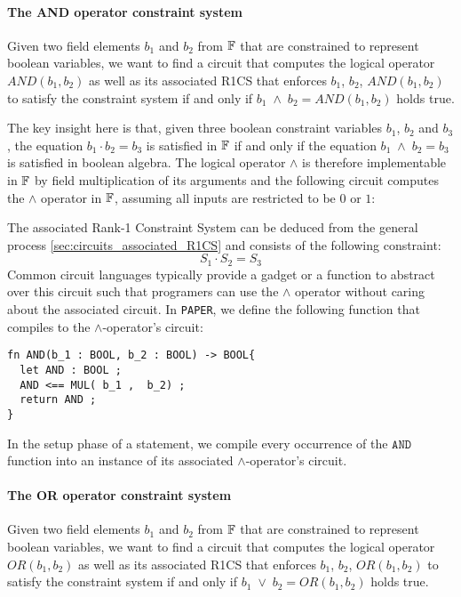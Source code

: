 \paragraph{The AND operator constraint system} Given two field elements $b_1$ and $b_2$ from $\mathbb{F}$ that are constrained to represent boolean variables, we want to find a circuit that computes the logical  operator $AND(b_1,b_2)$ as well as its associated R1CS that enforces $b_1$, $b_2$, $AND(b_1,b_2)$ to satisfy the constraint system if and only if $b_1\; \wedge \; b_2 =AND(b_1,b_2)$ holds true. 

The key insight here is that, given three boolean constraint variables $b_1$, $b_2$ and $b_3$, the equation $b_1\cdot b_2 = b_3$ is satisfied in $\mathbb{F}$ if and only if the equation $b_1\; \wedge \; b_2 = b_3$ is satisfied in boolean algebra. The logical operator $\wedge$ is therefore implementable in $\mathbb{F}$ by field multiplication of its arguments and the following circuit computes the $\wedge$ operator in $\mathbb{F}$, assuming all inputs are restricted to be $0$ or $1$:
\begin{center}
\end{center}
The associated Rank-1 Constraint System can be deduced from the general process \ref{sec:circuits_associated_R1CS} and consists of the following constraint:
\begin{equation}
 S_1 \cdot S_2 = S_3
\end{equation}
Common circuit languages typically provide a gadget or a function to abstract over this circuit such that programers can use the $\wedge$ operator without caring about the associated circuit. In \texttt{PAPER}, we define the following function that compiles to the $\wedge$-operator's circuit:
\begin{lstlisting}
fn AND(b_1 : BOOL, b_2 : BOOL) -> BOOL{
  let AND : BOOL ; 
  AND <== MUL( b_1 ,  b_2) ;
  return AND ;
}
\end{lstlisting}
In the setup phase of a statement, we compile every occurrence of the $\mathtt{AND}$ function into an instance of its associated $\wedge$-operator's circuit.
\paragraph{The OR operator constraint system}
\label{def:boolean-or} Given two field elements $b_1$ and $b_2$ from $\mathbb{F}$ that are constrained to represent boolean variables, we want to find a circuit that computes the logical  operator $OR(b_1,b_2)$ as well as its associated R1CS that enforces $b_1$, $b_2$, $OR(b_1,b_2)$ to satisfy the constraint system if and only if $b_1\; \vee \; b_2 = OR(b_1,b_2)$ holds true. 

